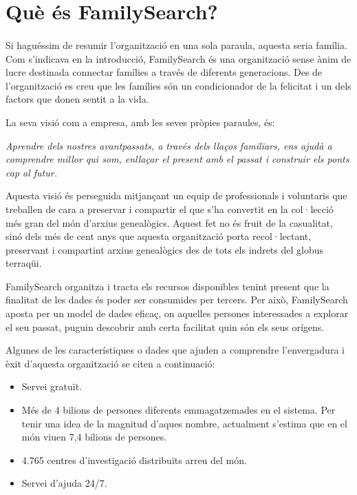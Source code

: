 \section{Què és FamilySearch?}

    \paragraph{}
    Si haguéssim de resumir l’organització en una sola paraula, aquesta seria família. Com s’indicava en la introducció, FamilySearch és una organització sense ànim de lucre destinada  connectar famílies a través de diferents generacions. Des de l’organització es creu que les famílies són un condicionador de la felicitat i un dels factors que donen sentit a la vida.

    La seva visió com a empresa, amb les seves pròpies paraules, és:

    \begin{displayquote}
        \emph{Aprendre dels nostres avantpassats, a través dels llaços familiars, ens ajudà a comprendre millor qui som, enllaçar el present amb el passat i construir els ponts cap al futur.}
    \end{displayquote}

    Aquesta visió és perseguida mitjançant un equip de professionals i voluntaris que treballen de cara a preservar i compartir el que s'ha convertit en la col·lecció més gran del món d'arxius genealògics. Aquest fet no és fruit de la casualitat, sinó dels més de cent anys que aquesta organització porta recol·lectant, preservant i compartint arxius genealògics des de tots els indrets del globus terraqüi.

    FamilySearch organitza i tracta els recursos disponibles tenint present que la finalitat de les dades és poder ser consumides per tercers. Per això, FamilySearch aposta per un model de dades eficaç, on aquelles persones interessades a explorar el seu passat, puguin descobrir amb certa facilitat quin són els seus orígens.

    Algunes de les característiques o dades que ajuden a comprendre l'envergadura i èxit d’aquesta organització se citen a continuació:

    \begin{itemize}
        \item Servei gratuït.
        \item Més de 4 bilions de persones diferents emmagatzemades en el sistema. Per tenir una idea de la magnitud d'aques nombre, actualment s’estima que en el món viuen 7,4 bilions de persones.
        \item 4.765 centres d’investigació distribuïts arreu del món.
        \item Servei d'ajuda 24/7.
    \end{itemize}
